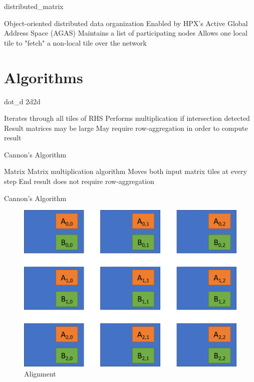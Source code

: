 \documentclass[10pt]{beamer}
\begin{document}
\begin{frame}{distributed\_matrix}
	\begin{outline}
		\1 Object-oriented distributed data organization
		\1 Enabled by HPX's Active Global Address Space (AGAS)
		\1 Maintains a list of participating nodes
		\1 Allows one local tile to "fetch" a non-local tile over the network			
	\end{outline}
\end{frame}

\section{Algorithms}

\begin{frame}{dot\_d 2d2d}
\begin{outline}
	\1 Iterates through all tiles of RHS
		\2 Performs multiplication if intersection detected
	\1 Result matrices may be large
	\1 May require row-aggregation in order to compute result
\end{outline}
\end{frame}


\begin{frame}{Cannon's Algorithm}
	\begin{outline}
		\1 Matrix Matrix multiplication algorithm
		\1 Moves both input matrix tiles at every step
		\1 End result does not require row-aggregation
	\end{outline}
\end{frame}



\begin{frame}{Cannon's Algorithm}
	\begin{figure}	
		\centering
		\includegraphics[width=0.72\linewidth]{figures/step_1_cannon.png}
		\caption{Alignment}
	\end{figure}
\end{frame}
\end{document}
